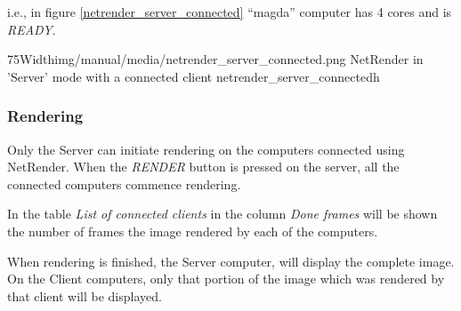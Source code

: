 i.e., in figure \ref{netrender_server_connected} ``magda'' computer has 4 cores and is \emph{READY}.

\simpleImageWithCaption75Width{img/manual/media/netrender_server_connected.png}
{NetRender in 'Server' mode with a connected client}
{netrender_server_connected}{h}

\subsubsection{Rendering}\label{rendering}

Only the Server can initiate rendering on the computers connected using
NetRender. When the \emph{RENDER} button is pressed on the server, all the
connected computers commence rendering.

In the table \emph{List of connected clients} in the column \emph{Done frames} will be
shown the number of frames the image rendered by each of the computers.

When rendering is finished, the Server computer, will display the complete
image. On the Client computers, only that portion of the image which was
rendered by that client will be displayed.
